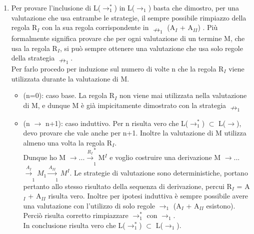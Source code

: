 \documentclass[10pt,a4paper, italian]{book}
\begin{document}
{{{\begin{enumerate}
\begin{prooftree}
\end{prooftree}
\begin{prooftree}
\end{prooftree}
\noindent Dunque riesco a giungere a una forma normale.\\
Cosa che non \`e possibile con la strategia $\rightarrow_1^\ast$. In quanto (($\lambda$x.x)z)(($\lambda$y.y)w) $\rightarrow_1^\ast$ (($\lambda$x.x)z)(($\lambda$y.y)w)  che non \`e in forma normale ((($\lambda$x.x)z)(($\lambda$y.y)w) $\nrightarrow_1^\ast$).\\
In conclusione risulta vero che L($\rightarrow_1^\ast$) $\nsubseteq$ L($\rightarrow_1$).
\item Per provare l'inclusione di L($\rightarrow_1^\ast$) in L($\rightarrow_1$) basta che dimostro, per una valutazione che usa entrambe le strategie, il sempre possibile rimpiazzo della regola R$_I$ con la sua regola corrispondente in $\nrightarrow_1$ (A$_I$ + A$_{II}$) . Pi\`u formalmente significa provare che per ogni valutazione di un termine M, che usa la regola R$_I$, si pu\`o sempre ottenere una valutazione che usa solo regole della strategia $\nrightarrow_1$.\\ Per farlo procedo per induzione sul numero di volte n che la regola R$_I$ viene utilizzata durante la valutazione di M.
\begin{itemize}
\item (n=0): caso base. La regola R$_I$ non viene mai utilizzata nella valutazione di M, e dunque M \`e gi\`a impicitamente dimostrato con la strategia $\nrightarrow_1$
\item (n $\rightarrow$ n+1): caso induttivo. Per n risulta vero che L($\rightarrow_1^\ast$) $\subset$ L($\rightarrow$), devo provare che vale anche per n+1. Inoltre la valutazione di M utilizza almeno una volta la regola R$_I$.\\
Dunque ho M $\rightarrow$...$\xrightarrow[]{R_I}_1^\ast$M$^I$ e voglio costruire una derivazione M $\rightarrow$...$\xrightarrow[]{A_I}_1M_1\xrightarrow[]{A_{II}}_1M^I$.
Le strategie di valutazione sono deterministiche, portano pertanto allo stesso risultato della sequenza di derivazione, percui R$_I$ = A$_I$ + A$_{II}$ risulta vero. Inoltre per ipotesi induttiva \`e sempre possibile avere una valutazione con l'utilizzo di solo regole $\rightarrow_1$ (A$_I$ + A$_{II}$ esistono). Perci\`o risulta corretto rimpiazzare $\rightarrow_1^\ast$ con $\rightarrow_1$.\\ In conclusione risulta vero che L($\rightarrow_1^\ast$) $\subset$ L($\rightarrow_1$).
\end{itemize}
\end{enumerate}






}}}
\end{document}
